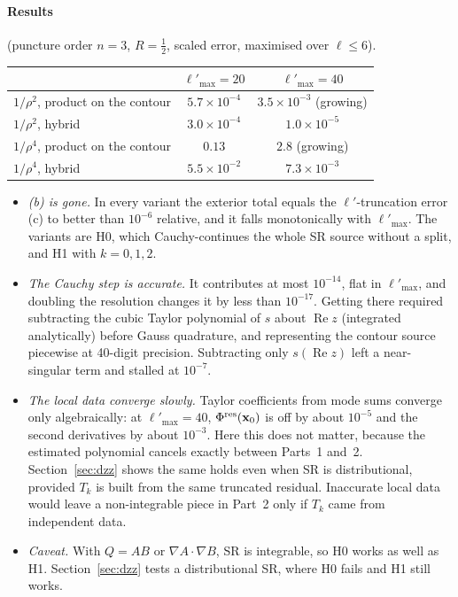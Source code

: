 \documentclass[11pt,a4paper]{article}
\renewcommand{\Re}{\operatorname{Re}}
\newcommand{\x}{\mathbf{x}}
\begin{document}
\paragraph{Results} (puncture order $n=3$, $R=\tfrac12$, scaled error, maximised over $\ell\le6$).
\begin{center}
\small
\renewcommand{\arraystretch}{1.15}
\begin{tabular}{@{}lcc@{}}
\toprule
& $\ell'_{\max}=20$ & $\ell'_{\max}=40$\\
\midrule
$1/\rho^2$, product on the contour & $5.7\times10^{-4}$ & $3.5\times10^{-3}$ (growing)\\
$1/\rho^2$, hybrid & $3.0\times10^{-4}$ & $1.0\times10^{-5}$\\
$1/\rho^4$, product on the contour & $0.13$ & $2.8$ (growing)\\
$1/\rho^4$, hybrid & $5.5\times10^{-2}$ & $7.3\times10^{-3}$\\
\bottomrule
\end{tabular}
\end{center}
\begin{itemize}[nosep]
\item \emph{(b) is gone.}
  In every variant the exterior total equals the $\ell'$-truncation error (c) to better than $10^{-6}$ relative, and it falls monotonically with $\ell'_{\max}$.
  The variants are H0, which Cauchy-continues the whole SR source without a split, and H1 with $k=0,1,2$.
\item \emph{The Cauchy step is accurate.}
  It contributes at most $10^{-14}$, flat in $\ell'_{\max}$, and doubling the resolution changes it by less than $10^{-17}$.
  Getting there required subtracting the cubic Taylor polynomial of $s$ about $\Re z$ (integrated analytically) before Gauss quadrature, and representing the contour source piecewise at 40-digit precision.
  Subtracting only $s(\Re z)$ left a near-singular term and stalled at $10^{-7}$.
\item \emph{The local data converge slowly.}
  Taylor coefficients from mode sums converge only algebraically: at $\ell'_{\max}=40$, $\Phi^{\rm res}(\x_0)$ is off by about $10^{-5}$ and the second derivatives by about $10^{-3}$.
  Here this does not matter, because the estimated polynomial cancels exactly between Parts~1 and~2.
  Section~\ref{sec:dzz} shows the same holds even when SR is distributional, provided $T_k$ is built from the same truncated residual. Inaccurate local data would leave a non-integrable piece in Part~2 only if $T_k$ came from independent data.
\item \emph{Caveat.}
  With $Q=AB$ or $\nabla A\cdot\nabla B$, SR is integrable, so H0 works as well as H1.
  Section~\ref{sec:dzz} tests a distributional SR, where H0 fails and H1 still works.
\end{itemize}
\end{document}

